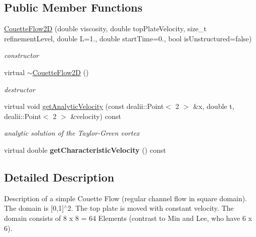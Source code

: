 \subsection*{Public Member Functions}
\begin{DoxyCompactItemize}
\item 
\hyperlink{classnatrium_1_1CouetteFlow2D_a94e51b7eaff3998383f1d7dc07b994cb}{Couette\-Flow2\-D} (double viscosity, double top\-Plate\-Velocity, size\-\_\-t refinement\-Level, double L=1., double start\-Time=0., bool is\-Unstructured=false)
\begin{DoxyCompactList}\small\item\em constructor \end{DoxyCompactList}\item 
\hypertarget{classnatrium_1_1CouetteFlow2D_a97b61b0f71dc653427ba3db46e185873}{virtual \hyperlink{classnatrium_1_1CouetteFlow2D_a97b61b0f71dc653427ba3db46e185873}{$\sim$\-Couette\-Flow2\-D} ()}\label{classnatrium_1_1CouetteFlow2D_a97b61b0f71dc653427ba3db46e185873}

\begin{DoxyCompactList}\small\item\em destructor \end{DoxyCompactList}\item 
\hypertarget{classnatrium_1_1CouetteFlow2D_a3953d81acbab33424dfc4135930253df}{virtual void \hyperlink{classnatrium_1_1CouetteFlow2D_a3953d81acbab33424dfc4135930253df}{get\-Analytic\-Velocity} (const dealii\-::\-Point$<$ 2 $>$ \&x, double t, dealii\-::\-Point$<$ 2 $>$ \&velocity) const }\label{classnatrium_1_1CouetteFlow2D_a3953d81acbab33424dfc4135930253df}

\begin{DoxyCompactList}\small\item\em analytic solution of the Taylor-\/\-Green vortex \end{DoxyCompactList}\item 
\hypertarget{classnatrium_1_1CouetteFlow2D_a74429d98c455a0c06430a665505d8375}{virtual double {\bfseries get\-Characteristic\-Velocity} () const }\label{classnatrium_1_1CouetteFlow2D_a74429d98c455a0c06430a665505d8375}

\end{DoxyCompactItemize}


\subsection{Detailed Description}
Description of a simple Couette Flow (regular channel flow in square domain). The domain is \mbox{[}0,1\mbox{]}$^\wedge$2. The top plate is moved with constant velocity. The domain consists of 8 x 8 = 64 Elements (contrast to Min and Lee, who have 6 x 6). 

